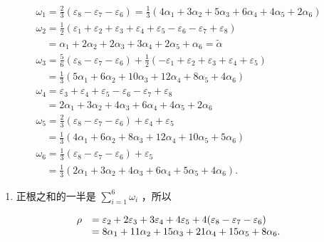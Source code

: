 \[
\begin{array}{l} \omega_ {1} = \frac {2}{3} (\varepsilon_ {8} - \varepsilon_ {7} - \varepsilon_ {6}) = \frac {1}{3} (4 \alpha_ {1} + 3 \alpha_ {2} + 5 \alpha_ {3} + 6 \alpha_ {4} + 4 \alpha_ {5} + 2 \alpha_ {6}) \\ \omega_ {2} = \frac {1}{2} (\varepsilon_ {1} + \varepsilon_ {2} + \varepsilon_ {3} + \varepsilon_ {4} + \varepsilon_ {5} - \varepsilon_ {6} - \varepsilon_ {7} + \varepsilon_ {8}) \\ \quad = \alpha_ {1} + 2 \alpha_ {2} + 2 \alpha_ {3} + 3 \alpha_ {4} + 2 \alpha_ {5} + \alpha_ {6} = \tilde {\alpha} \\ \omega_ {3} = \frac {5}{6} (\varepsilon_ {8} - \varepsilon_ {7} - \varepsilon_ {6}) + \frac {1}{2} (- \varepsilon_ {1} + \varepsilon_ {2} + \varepsilon_ {3} + \varepsilon_ {4} + \varepsilon_ {5}) \\ \quad = \frac {1}{3} (5 \alpha_ {1} + 6 \alpha_ {2} + 10 \alpha_ {3} + 12 \alpha_ {4} + 8 \alpha_ {5} + 4 \alpha_ {6}) \\ \omega_ {4} = \varepsilon_ {3} + \varepsilon_ {4} + \varepsilon_ {5} - \varepsilon_ {6} - \varepsilon_ {7} + \varepsilon_ {8} \\ \quad = 2 \alpha_ {1} + 3 \alpha_ {2} + 4 \alpha_ {3} + 6 \alpha_ {4} + 4 \alpha_ {5} + 2 \alpha_ {6} \\ \omega_ {5} = \frac {2}{3} (\varepsilon_ {8} - \varepsilon_ {7} - \varepsilon_ {6}) + \varepsilon_ {4} + \varepsilon_ {5} \\ \quad = \frac {1}{3} (4 \alpha_ {1} + 6 \alpha_ {2} + 8 \alpha_ {3} + 12 \alpha_ {4} + 10 \alpha_ {5} + 5 \alpha_ {6}) \\ \omega_ {6} = \frac {1}{3} (\varepsilon_ {8} - \varepsilon_ {7} - \varepsilon_ {6}) + \varepsilon_ {5} \\ \quad = \frac {1}{3} (2 \alpha_ {1} + 3 \alpha_ {2} + 4 \alpha_ {3} + 6 \alpha_ {4} + 5 \alpha_ {5} + 4 \alpha_ {6}). \end{array}
\]

\begin{enumerate}
\def\labelenumi{(\Roman{enumi})}
\setcounter{enumi}{6}
\tightlist
\item
  正根之和的一半是 \(\sum_{i=1}^{6} \omega_i\) ，所以
\end{enumerate}

\[
\begin{array}{r l} \rho & = \varepsilon_ {2} + 2 \varepsilon_ {3} + 3 \varepsilon_ {4} + 4 \varepsilon_ {5} + 4 (\varepsilon_ {8} - \varepsilon_ {7} - \varepsilon_ {6}) \\ & = 8 \alpha_ {1} + 11 \alpha_ {2} + 15 \alpha_ {3} + 21 \alpha_ {4} + 15 \alpha_ {5} + 8 \alpha_ {6}. \end{array}
\]

